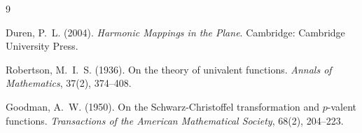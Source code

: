 \begin{thebibliography}{9}
	
	Duren, P.~L. (2004).
	\textit{Harmonic Mappings in the Plane}.
	Cambridge: Cambridge University Press.
	
	Robertson, M.~I.~S. (1936).
	On the theory of univalent functions.
	\textit{Annals of Mathematics}, 37(2), 374--408.
	
	Goodman, A.~W. (1950).
	On the Schwarz-Christoffel transformation and $p$-valent functions.
	\textit{Transactions of the American Mathematical Society}, 68(2), 204--223.
	
\end{thebibliography}